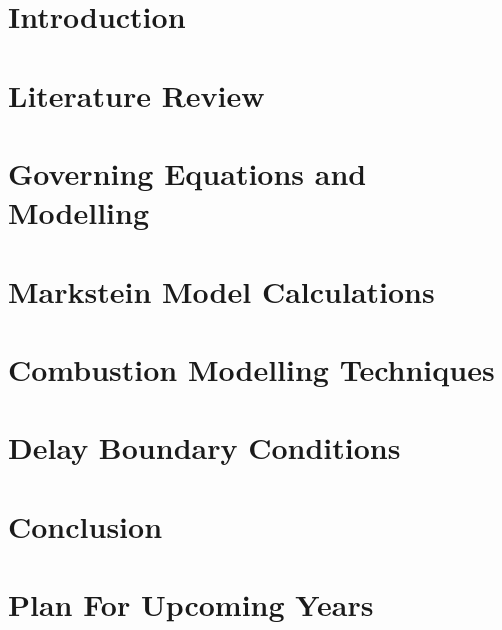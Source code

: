 \documentclass[lmr,second,hyperref,rgb,hyperref,dvipsnames]{uom_thesis_casson}
\title{\xmp@Title}
\author{\xmp@Author}
\begin{document}
\maketitle



\uomtoc

\uomstartmainbody %


\chapter{Introduction} \label{ch:intro}


\chapter{Literature Review} \label{ch:lit-review}


\chapter{Governing Equations and Modelling} \label{ch:govern-eqns}


\chapter{Markstein Model Calculations} \label{ch:markstein}


\chapter{Combustion Modelling Techniques} \label{ch:techniques}


\chapter{Delay Boundary Conditions} \label{ch:delay-bcs}


\chapter{Conclusion} \label{ch:conc}


\chapter{Plan For Upcoming Years} \label{ch:plan}



\printbibliography[title={References},heading=bibintoc]
\end{document}

